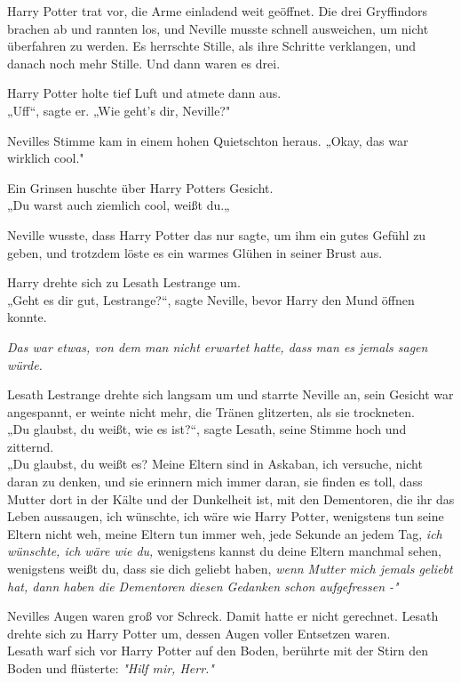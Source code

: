 {Harry Potter trat vor, die Arme einladend weit geöffnet. Die drei Gryffindors brachen ab und rannten los, und Neville musste schnell ausweichen, um nicht überfahren zu werden. Es herrschte Stille, als ihre Schritte verklangen, und danach noch mehr Stille. Und dann waren es drei.

Harry Potter holte tief Luft und atmete dann aus.\\ „Uff“, sagte er. „Wie geht's dir, Neville?"

Nevilles Stimme kam in einem hohen Quietschton heraus. „Okay, das war wirklich cool."

Ein Grinsen huschte über Harry Potters Gesicht.\\ „Du warst auch ziemlich cool, weißt du.„

Neville wusste, dass Harry Potter das nur sagte, um ihm ein gutes Gefühl zu geben, und trotzdem löste es ein warmes Glühen in seiner Brust aus.

Harry drehte sich zu Lesath Lestrange um.\\ „Geht es dir gut, Lestrange?“, sagte Neville, bevor Harry den Mund öffnen konnte.

\emph{Das war etwas, von dem man nicht erwartet hatte, dass man es jemals sagen würde.}

Lesath Lestrange drehte sich langsam um und starrte Neville an, sein Gesicht war angespannt, er weinte nicht mehr, die Tränen glitzerten, als sie trockneten.\\ „Du glaubst, du weißt, wie es ist?“, sagte Lesath, seine Stimme hoch und zitternd.\\ „Du glaubst, du weißt es? Meine Eltern sind in Askaban, ich versuche, nicht daran zu denken, und sie erinnern mich immer daran, sie finden es toll, dass Mutter dort in der Kälte und der Dunkelheit ist, mit den Dementoren, die ihr das Leben aussaugen, ich wünschte, ich wäre wie Harry Potter, wenigstens tun seine Eltern nicht weh, meine Eltern tun immer weh, jede Sekunde an jedem Tag, \emph{ich wünschte, ich wäre wie du,} wenigstens kannst du deine Eltern manchmal sehen, wenigstens weißt du, dass sie dich geliebt haben, \emph{wenn Mutter mich jemals geliebt hat, dann haben die Dementoren diesen Gedanken schon aufgefressen -"}

Nevilles Augen waren groß vor Schreck. Damit hatte er nicht gerechnet. Lesath drehte sich zu Harry Potter um, dessen Augen voller Entsetzen waren.\\ Lesath warf sich vor Harry Potter auf den Boden, berührte mit der Stirn den Boden und flüsterte: \emph{"Hilf mir, Herr."}

}
